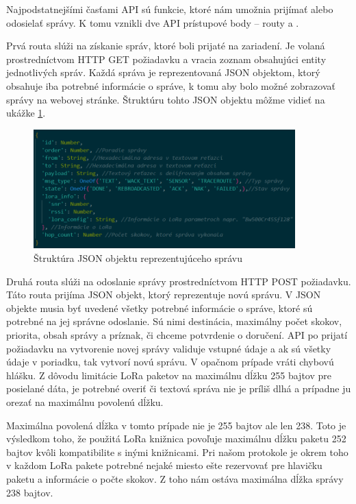 \documentclass[slovak,master]{diploma}
\begin{document}
Najpodstatnejšími časťami API sú funkcie, ktoré nám umožnia prijímať alebo odosielať správy. K tomu vznikli dve 
API prístupové body -- routy  a .

Prvá routa slúži na získanie správ, ktoré boli prijaté na zariadení. Je volaná prostredníctvom HTTP GET požiadavku a 
vracia zoznam obsahujúci entity jednotlivých správ. Každá správa je reprezentovaná JSON objektom, ktorý obsahuje 
iba potrebné informácie o správe, k tomu aby bolo možné zobrazovať správy na webovej stránke. Štruktúru tohto JSON 
objektu môžme vidieť na ukážke \ref{fig:messageObj}.

\begin{figure}[h!]
	\centering
	\includegraphics[width=0.9\textwidth]{Figures/msgObject.png}
	\caption{Štruktúra JSON objektu reprezentujúceho správu}
	\label{fig:messageObj}
\end{figure}

Druhá routa slúži na odoslanie správy prostredníctvom HTTP POST požiadavku. Táto routa prijíma JSON objekt, ktorý reprezentuje novú správu.
V JSON objekte musia byť uvedené všetky potrebné informácie o správe, ktoré sú potrebné na jej správne odoslanie. 
Sú nimi destinácia, maximálny počet skokov, priorita, obsah správy a príznak, či chceme potvrdenie o doručení. 
API po prijatí požiadavku na vytvorenie novej správy validuje vstupné údaje a ak sú všetky údaje v poriadku, tak vytvorí novú správu. V 
opačnom prípade vráti chybovú hlášku. Z dôvodu limitácie LoRa paketov na maximálnu dĺžku 255 bajtov pre posielané dáta, je potrebné overiť či textová správa 
nie je príliš dlhá a prípadne ju orezať na maximálnu povolenú dĺžku.

Maximálna povolená dĺžka v tomto prípade nie je 255 bajtov ale len 238. Toto je výsledkom toho, 
že použitá LoRa knižnica povoľuje maximálnu dĺžku paketu 252 bajtov kvôli kompatibilite s inými knižnicami.
Pri našom protokole je okrem toho v každom LoRa pakete potrebné nejaké miesto ešte rezervovať pre hlavičku paketu a informácie o počte skokov.
Z toho nám ostáva maximálna dĺžka správy 238 bajtov.
\end{document}
